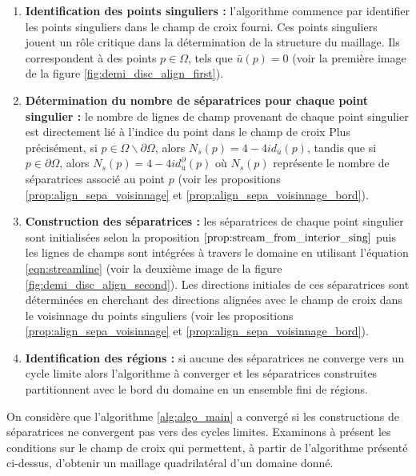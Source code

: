 \begin{enumerate}
\item \textbf{Identification des points singuliers :} l'algorithme commence par identifier les points singuliers dans le champ de croix fourni. Ces points singuliers jouent un rôle critique dans la détermination de la structure du maillage. Ils correspondent à des points $p\in\Omega$, tels que $\bar{u}(p)=0$ (voir la première image de la figure \ref{fig:demi_disc_align_first}).\\
\item \textbf{Détermination du nombre de séparatrices pour chaque point singulier :}
le nombre de lignes de champ provenant de chaque point singulier est directement lié à l'indice du point dans le champ de croix Plus précisément, si $p\in\Omega\backslash\partial\Omega$, alors $N_s(p) = 4 - 4id_{\bar{u}}(p)$, tandis que si $p\in\partial\Omega$, alors $N_s(p) = 4 - 4id_{\bar{u}}^\partial(p)$ où $N_s(p)$ représente le nombre de séparatrices associé au point $p$ (voir les propositions \ref{prop:align_sepa_voisinnage} et \ref{prop:align_sepa_voisinnage_bord}).\\
\item \textbf{Construction des séparatrices :} les séparatrices de chaque point singulier sont initialisées selon la proposition $\ref{prop:stream_from_interior_sing}$ puis les lignes de champs sont intégrées à travers le domaine en utilisant l'équation \eqref{eqn:streamline} (voir la deuxième image de la figure \ref{fig:demi_disc_align_second}). Les directions initiales de ces séparatrices sont déterminées en cherchant des directions alignées avec le champ de croix dans le voisinnage du points singuliers  (voir les propositions \ref{prop:align_sepa_voisinnage} et \ref{prop:align_sepa_voisinnage_bord}).\\
\item \textbf{Identification des régions :} si aucune des séparatrices ne converge vers un cycle limite alors l'algorithme à converger et les séparatrices construites partitionnent avec le bord du domaine en un ensemble fini de régions.\\
\end{enumerate}

On considère que l'algorithme
\ref{alg:algo_main} a convergé si les constructions de séparatrices ne convergent pas vers des cycles limites. Examinons à présent les conditions sur le champ de croix qui permettent, à partir de l'algorithme présenté ci-dessus, d'obtenir un maillage quadrilatéral d'un domaine donné.

